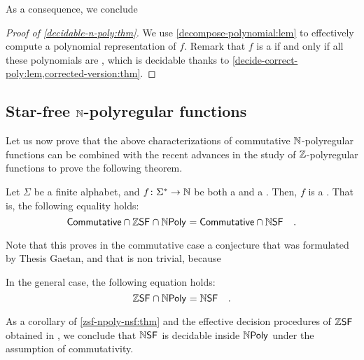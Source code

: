 \documentclass[sigconf,natbib=false,screen, review,anonymous]{acmart}
\begin{document}
As a consequence, we conclude 
\begin{proof}[Proof of \cref{decidable-n-poly:thm}]
    We use \cref{decompose-polynomial:lem}
    to effectively compute
    a polynomial representation of $f$. Remark that
    $f$ is a  if and only if
    all these polynomials are ,
    which is decidable thanks to
    \cref{decide-correct-poly:lem,corrected-version:thm}.
\end{proof}

\subsection{Star-free $\mathbb{N}$-polyregular functions}


Let us now prove that the above characterizations of
commutative
$\mathbb{N}$-polyregular functions can be combined with the recent
advances in the study of $\mathbb{Z}$-polyregular functions 
\cite{LOPEZ23b}
to prove the following theorem.

\begin{theorem}
    \label{zsf-npoly-nsf:thm}
    Let $\Sigma$ be a finite alphabet, and $f \colon \Sigma^* \to \mathbb{N}$
    be both a 
    and a  .
    Then, $f$ is a  .
    That is, the following equality holds:
    \begin{equation*}
        \ZCommut \cap \ZSF \cap \NPoly
        = \ZCommut \cap \NSF
        \quad .
    \end{equation*}
\end{theorem}

Note that this proves in the commutative case a conjecture that was 
formulated by Thesis Gaetan, and that is non trivial, because 

\begin{conjecture}
    \label{nsf-zsf:conj}
    In the general case, the following equation holds:
    \begin{equation*}
        \ZSF \cap \NPoly
        = 
        \NSF
        \quad .
    \end{equation*}
\end{conjecture}

As a corollary of \cref{zsf-npoly-nsf:thm} and the effective decision
procedures of $\ZSF$ obtained in \cite{LOPEZ23b}, we conclude that $\NSF$ is
decidable inside $\NPoly$ under the assumption of commutativity.
\end{document}
